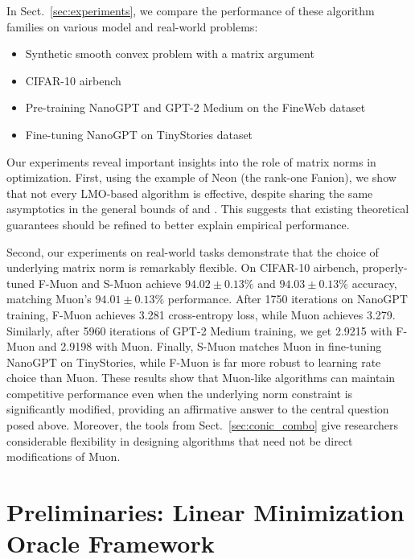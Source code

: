 \documentclass[smallextended,referee,envcountsect]{svjour3}
\newcommand{\sectionref}[1]{Sect.~\ref{#1}}
\begin{document}
 In \sectionref{sec:experiments}, we compare the performance of these algorithm families on various model and real-world problems:
 \begin{itemize}
   \item Synthetic smooth convex problem with a matrix argument
   \item CIFAR-10 airbench \citep{cifar2023airbench}
   \item Pre-training NanoGPT and GPT-2 Medium on the FineWeb dataset \citep{modded_nanogpt_2024}
   \item Fine-tuning NanoGPT on TinyStories dataset \citep{eldan2023tinystoriessmalllanguagemodels}
 \end{itemize}
 
 Our experiments reveal important insights into the role of matrix norms in optimization. First, using the example of Neon (the rank-one Fanion), we show that not every LMO-based algorithm is effective, despite sharing the same asymptotics in the general bounds of \citep{kovalev2025understanding} and \citep{riabinin2025gluon}. This suggests that existing theoretical guarantees should be refined to better explain empirical performance.
 
 Second, our experiments on real-world tasks demonstrate that the choice of underlying matrix norm is remarkably flexible. On CIFAR-10 airbench, properly-tuned F-Muon and S-Muon achieve $94.02 \pm 0.13\%$ and $94.03 \pm 0.13\%$ accuracy, matching Muon's $94.01 \pm 0.13\%$ performance. After 1750 iterations on NanoGPT training, F-Muon achieves 3.281 cross-entropy loss, while Muon achieves 3.279. Similarly, after 5960 iterations of GPT-2 Medium training, we get 2.9215 with F-Muon and 2.9198 with Muon. Finally, S-Muon matches Muon in fine-tuning NanoGPT on TinyStories, while F-Muon is far more robust to learning rate choice than Muon. These results show that Muon-like algorithms can maintain competitive performance even when the underlying norm constraint is significantly modified, providing an affirmative answer to the central question posed above. Moreover, the tools from \sectionref{sec:conic_combo} give researchers considerable flexibility in designing algorithms that need not be direct modifications of Muon.
 
 \section{Preliminaries: Linear Minimization Oracle Framework}
 
\end{document}
